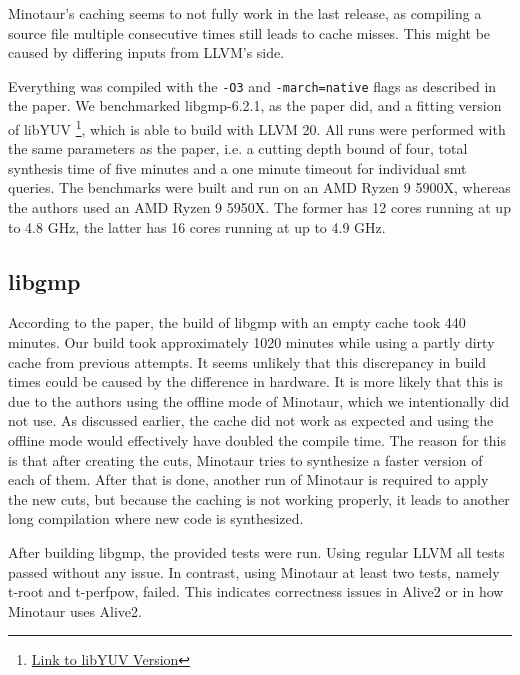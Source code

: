 	Minotaur's caching seems to not fully work in the last release, as compiling a source file multiple consecutive times still leads to cache misses.
	This might be caused by differing inputs from LLVM's side.

	Everything was compiled with the \texttt{-O3} and \texttt{-march=native} flags as described in the paper.
	We benchmarked libgmp-6.2.1, as the paper did, and a fitting version of libYUV \footnote{\href{https://chromium.googlesource.com/libYUV/libYUV/+/8a93618f98e3bcd682615a704dd3410d0fee09e4}{Link to libYUV Version}}, which is able to build with LLVM 20.
	All runs were performed with the same parameters as the paper, i.e. a cutting depth bound of four, total synthesis time of five minutes and a one minute timeout for individual \gls*{smt} queries.
	The benchmarks were built and run on an AMD Ryzen 9 5900X, whereas the authors used an AMD Ryzen 9 5950X.
	The former has 12 cores running at up to 4.8 GHz, the latter has 16 cores running at up to 4.9 GHz.

	\subsection{libgmp}
	According to the paper, the build of libgmp with an empty cache took 440 minutes.
	Our build took approximately 1020 minutes while using a partly dirty cache from previous attempts.
	It seems unlikely that this discrepancy in build times could be caused by the difference in hardware.
	It is more likely that this is due to the authors using the offline mode of Minotaur, which we intentionally did not use.
	As discussed earlier, the cache did not work as expected and using the offline mode would effectively have doubled the compile time.
	The reason for this is that after creating the cuts, Minotaur tries to synthesize a faster version of each of them.
	After that is done, another run of Minotaur is required to apply the new cuts, but because the caching is not working properly, it leads to another long compilation where new code is synthesized.

	After building libgmp, the provided tests were run.
	Using regular LLVM all tests passed without any issue.
	In contrast, using Minotaur at least two tests, namely t-root and t-perfpow, failed.
	This indicates correctness issues in Alive2 or in how Minotaur uses Alive2.

